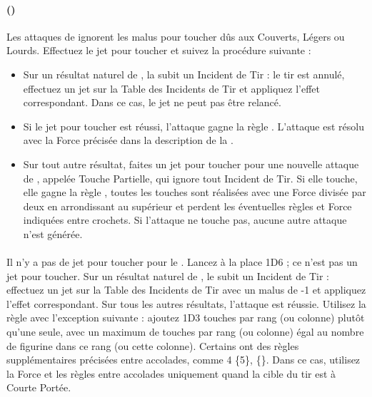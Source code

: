 \paragraph{\catapult{} ()}
\label{catapult}

Les attaques de \catapult{} ignorent les malus pour toucher dûs aux Couverts, Légers ou Lourds. Effectuez le jet pour toucher et suivez la procédure suivante :

\begin{itemize}[label={-}]
\item Sur un résultat naturel de , la \catapult{} subit un Incident de Tir : le tir est annulé, effectuez un jet sur la Table des Incidents de Tir et appliquez l'effet correspondant. Dans ce cas, le jet ne peut pas être relancé.
\item Si le jet pour toucher est réussi, l'attaque gagne la règle . L'attaque est résolu avec la Force précisée dans la description de la \catapult{}.
\item Sur tout autre résultat, faites un jet pour toucher pour une nouvelle attaque de \catapult{}, appelée Touche Partielle, qui ignore tout Incident de Tir. Si elle touche, elle gagne la règle , toutes les touches sont réalisées avec une Force divisée par deux en arrondissant au supérieur et perdent les éventuelles règles et Force indiquées entre crochets. Si l'attaque ne touche pas, aucune autre attaque n'est générée.
\end{itemize}

\paragraph{\flamethrower}

Il n'y a pas de jet pour toucher pour le \flamethrower{}. Lancez à la place 1D6 ; ce n'est pas un jet pour toucher. Sur un résultat naturel de , le \flamethrower{} subit un Incident de Tir : effectuez un jet sur la Table des Incidents de Tir avec un malus de -1 et appliquez l'effet correspondant. Sur tous les autres résultats, l'attaque est réussie. Utilisez la règle \penetrating{} avec l'exception suivante : ajoutez 1D3 touches par rang (ou colonne) plutôt qu'une seule, avec un maximum de touches par rang (ou colonne) égal au nombre de figurine dans ce rang (ou cette colonne). Certains \flamethrowers{} ont des règles supplémentaires précisées entre accolades, comme \Strength{} 4 \{5\}, \{\}. Dans ce cas, utilisez la Force et les règles entre accolades uniquement quand la cible du tir est à Courte Portée.


